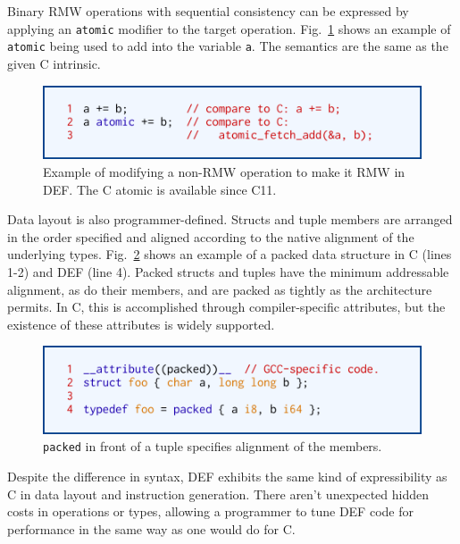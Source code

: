 Binary RMW operations with sequential consistency can be expressed by applying an \texttt{atomic} modifier to the target operation.  Fig.~\ref{fig:atomic} shows an example of \texttt{atomic} being used to add into the variable \texttt{a}.  The semantics are the same as the given C intrinsic.

\begin{figure}[htbp!]
        \centering
        \includegraphics[scale=0.25]{gfx/atomic}
        \caption{Example of modifying a non-RMW operation to make it RMW in DEF.  The C atomic is available since C11.}
        \label{fig:atomic}
\end{figure}

Data layout is also programmer-defined.  Structs and tuple members are arranged in the order specified and aligned according to the native alignment of the underlying types.  Fig.~\ref{fig:packed} shows an example of a packed data structure in C (lines 1-2) and DEF (line 4).  Packed structs and tuples have the minimum addressable alignment, as do their members, and are packed as tightly as the architecture permits.  In C, this is accomplished through compiler-specific attributes, but the existence of these attributes is widely supported.

\begin{figure}[htbp!]
        \centering
        \includegraphics[scale=0.25]{gfx/packed}
        \caption{\texttt{packed} in front of a tuple specifies alignment of the members.}
        \label{fig:packed}
\end{figure}

Despite the difference in syntax, DEF exhibits the same kind of expressibility as C in data layout and instruction generation.  There aren't unexpected hidden costs in operations or types, allowing a programmer to tune DEF code for performance in the same way as one would do for C.

